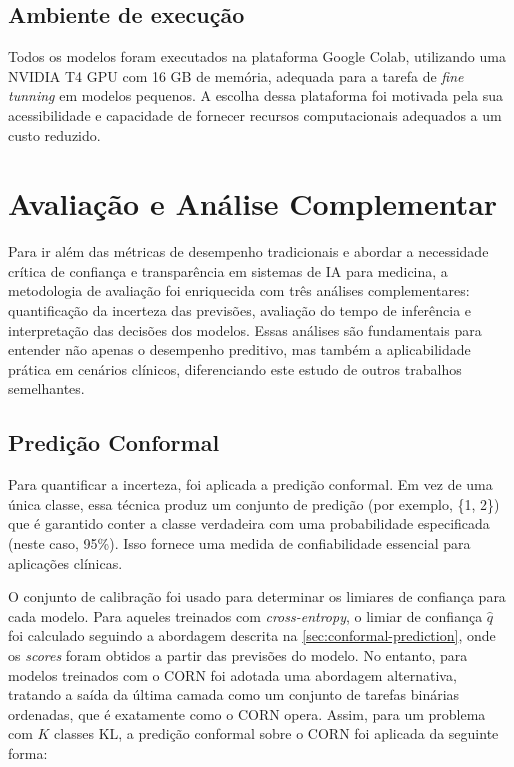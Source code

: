 \subsection{Ambiente de execução}

Todos os modelos foram executados na plataforma Google Colab, utilizando uma NVIDIA T4 GPU com 16 GB de memória, adequada para a tarefa de \textit{fine tunning} em modelos pequenos. A escolha dessa plataforma foi motivada pela sua acessibilidade e capacidade de fornecer recursos computacionais adequados a um custo reduzido.

\section{Avaliação e Análise Complementar}

Para ir além das métricas de desempenho tradicionais e abordar a necessidade crítica de confiança e transparência em sistemas de IA para medicina, a metodologia de avaliação foi enriquecida com três análises complementares: quantificação da incerteza das previsões, avaliação do tempo de inferência e interpretação das decisões dos modelos. Essas análises são fundamentais para entender não apenas o desempenho preditivo, mas também a aplicabilidade prática em cenários clínicos, diferenciando este estudo de outros trabalhos semelhantes.

\subsection{Predição Conformal}

Para quantificar a incerteza, foi aplicada a predição conformal. Em vez de uma única classe, essa técnica produz um conjunto de predição (por exemplo, \{1, 2\}) que é garantido conter a classe verdadeira com uma probabilidade especificada (neste caso, 95\%). Isso fornece uma medida de confiabilidade essencial para aplicações clínicas.

O conjunto de calibração foi usado para determinar os limiares de confiança para cada modelo. Para aqueles treinados com \textit{cross-entropy}, o limiar de confiança $\hat{q}$ foi calculado seguindo a abordagem descrita na \autoref{sec:conformal-prediction}, onde os \textit{scores} foram obtidos a partir das previsões do modelo. No entanto, para modelos treinados com o CORN foi adotada uma abordagem alternativa, tratando a saída da última camada como um conjunto de tarefas binárias ordenadas, que é exatamente como o CORN opera. Assim, para um problema com $K$ classes KL, a predição conformal sobre o CORN foi aplicada da seguinte forma:

